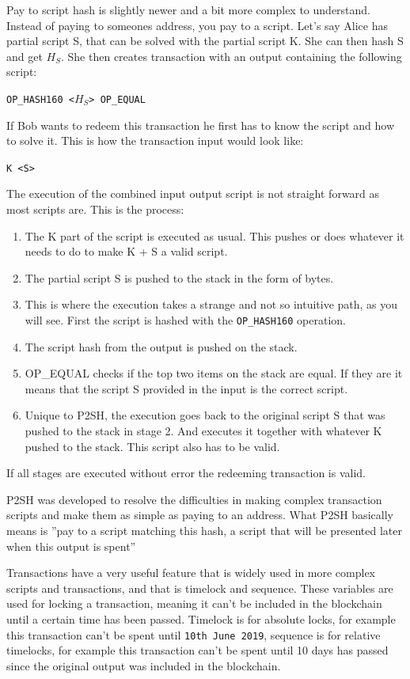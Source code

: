 Pay to script hash is slightly newer and a bit more complex to understand. Instead of paying to someones address, you pay to a script. Let's say Alice has partial script S, that can be solved with the partial script K. She can then hash S and get $H_S$. She then creates transaction with an output containing the following script:

\texttt{OP\_HASH160 <$H_S$> OP\_EQUAL}

If Bob wants to redeem this transaction he first has to know the script and how to solve it. This is how the transaction input would look like: 

\texttt{K <S>}

The execution of the combined input output script is not straight forward as most scripts are. This is the process:
\begin{enumerate}
	\item The K part of the script is executed as usual. This pushes or does whatever it needs to do to make K + S a valid script.
	\item The partial script S is pushed to the stack in the form of bytes.
	\item This is where the execution takes a strange and not so intuitive path, as you will see. First the script is hashed with the \texttt{OP\_HASH160} operation.
	\item The script hash from the output is pushed on the stack.
	\item OP\_EQUAL checks if the top two items on the stack are equal. If they are it means that the script S provided in the input is the correct script.
	\item Unique to P2SH, the execution goes back to the original script S that was pushed to the stack in stage 2. And executes it together with whatever K pushed to the stack. This script also has to be valid. 
\end{enumerate}

If all stages are executed without error the redeeming transaction is valid. 

P2SH was developed to resolve the difficulties in making complex transaction scripts and make them as simple as paying to an address. What P2SH basically means is ''pay to a script matching this hash, a script that will be presented later when this output is spent''

Transactions have a very useful feature that is widely used in more complex scripts and transactions, and that is timelock and sequence. These variables are used for locking a transaction, meaning it can't be included in the blockchain until a certain time has been passed. Timelock is for absolute locks, for example this transaction can't be spent until \texttt{10th June 2019}, sequence is for relative timelocks, for example this transaction can't be spent until 10 days has passed since the original output was included in the blockchain.

